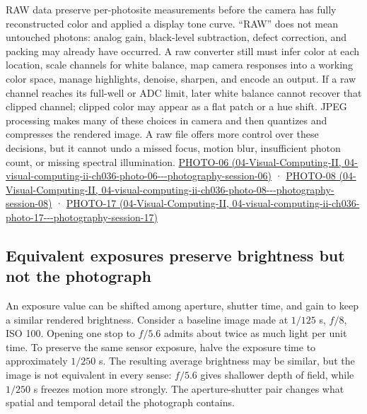 RAW data preserve per-photosite measurements before the camera has fully reconstructed color and applied a display tone curve. ``RAW'' does not mean untouched photons: analog gain, black-level subtraction, defect correction, and packing may already have occurred. A raw converter still must infer color at each location, scale channels for white balance, map camera responses into a working color space, manage highlights, denoise, sharpen, and encode an output. If a raw channel reaches its full-well or ADC limit, later white balance cannot recover that clipped channel; clipped color may appear as a flat patch or a hue shift. JPEG processing makes many of these choices in camera and then quantizes and compresses the rendered image. A raw file offers more control over these decisions, but it cannot undo a missed focus, motion blur, insufficient photon count, or missing spectral illumination. \href{../04-Visual-Computing-II/main.pdf\#nameddest=04-visual-computing-ii-ch036-photo-06---photography-session-06}{PHOTO-06 (04-Visual-Computing-II, 04-visual-computing-ii-ch036-photo-06-\/-\/-photography-session-06)} · \href{../04-Visual-Computing-II/main.pdf\#nameddest=04-visual-computing-ii-ch036-photo-08---photography-session-08}{PHOTO-08 (04-Visual-Computing-II, 04-visual-computing-ii-ch036-photo-08-\/-\/-photography-session-08)} · \href{../04-Visual-Computing-II/main.pdf\#nameddest=04-visual-computing-ii-ch036-photo-17---photography-session-17}{PHOTO-17 (04-Visual-Computing-II, 04-visual-computing-ii-ch036-photo-17-\/-\/-photography-session-17)}

\subsection{Equivalent exposures preserve brightness but not the photograph}\label{03-visual-computing-i-ch003-equivalent-exposures-preserve-brightness-but-not-the-photograph}

An exposure value can be shifted among aperture, shutter time, and gain to keep a similar rendered brightness. Consider a baseline image made at \(1/125\) s, \(f/8\), ISO 100. Opening one stop to \(f/5.6\) admits about twice as much light per unit time. To preserve the same sensor exposure, halve the exposure time to approximately \(1/250\) s. The resulting average brightness may be similar, but the image is not equivalent in every sense: \(f/5.6\) gives shallower depth of field, while \(1/250\) s freezes motion more strongly. The aperture-shutter pair changes what spatial and temporal detail the photograph contains.

